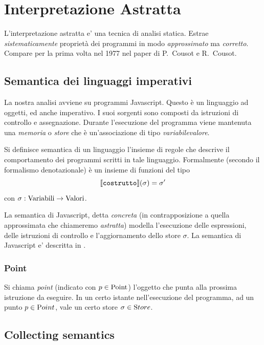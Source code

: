 \chapter{Interpretazione Astratta}

L'interpretazione astratta e' una tecnica di analisi statica. Estrae \emph{sistematicamente} proprietà dei programmi in modo \emph{approssimato} ma \emph{corretto}. Compare per la prima volta nel 1977 nel paper \cite{cousot} di P.~Cousot e R.~Cousot.

\section{Semantica dei linguaggi imperativi}

La nostra analisi avviene su programmi Javascript. Questo è un linguaggio ad oggetti, ed anche imperativo. I suoi sorgenti sono composti da istruzioni di controllo e assegnazione. Durante l'esecuzione del programma viene mantenuta una \emph{memoria} o \emph{store} che è un'associazione di tipo \emph{variabile\textrightarrow{}valore}. 

\begin{definition}[Semantica]
Si definisce semantica di un linguaggio l'insieme di regole che descrive il comportamento dei programmi scritti in tale linguaggio. Formalmente (secondo il formalismo denotazionale) è un insieme di funzioni del tipo
\[ \llbracket \texttt{costrutto} \rrbracket(\sigma) = \sigma' \]
con $\sigma : \mathrm{Variabili} \to \mathrm{Valori}$.
\end{definition}

La semantica di Javascript, detta \emph{concreta} (in contrapposizione a quella approssimata che chiameremo \emph{astratta}) modella l'esecuzione delle espressioni, delle istruzioni di controllo e l'aggiornamento dello store $\sigma$. La semantica di Javascript e' descritta in \cite{javascriptsemantics}. 

\subsection{Point}

Si chiama \emph{point} (indicato con $ p \in \mathrm{Point} $) l'oggetto che punta alla prossima istruzione da eseguire. In un certo istante nell'esecuzione del programma, ad un punto $p \in \mathrm{P}oint$, vale un certo store $\sigma \in \mathrm{S}tore$. 

\section{Collecting semantics}

